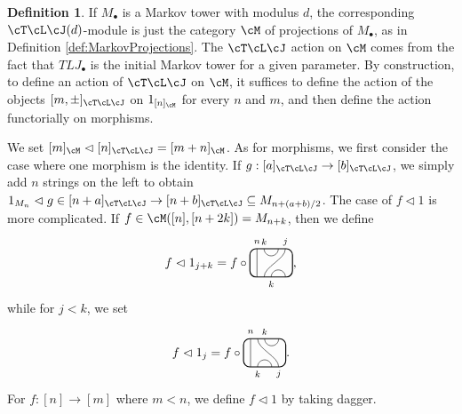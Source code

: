 \documentclass[11pt]{article}
\theoremstyle{plain}
\theoremstyle{definition}
\newtheorem{defn}[thm]{Definition}
\newcommand{\TLJ}{\cT\cL\cJ}
\newcommand{\TLPlusPIso}[3]{
 \TLTStart
 \TLTThrough{#1}
 \TLTSnakeR{#2}{#3}
 \TLTEnd
}
\newcommand{\TLMinusPIso}[3]{
 \TLTStart
 \TLTThrough{#1}
 \TLTSnakeL{#2}{#3}
 \TLTEnd
}
\newcommand{\TLTCalcLabelOffset}[3][0cm]{
 \settowidth{#2}{\scriptsize{$#3$}}
 \setlength{#2}{.5#2}
 \setlength{#2}{\maxof{#2}{#1}}
}
\newcommand{\TLTEnd}{
 \draw[thick, rounded corners = 5pt] (0,0) rectangle ($ (TLTlead) + (0,.8) $);
 \end{tikzpicture}
}
\newcommand{\TLTStart}{
 \begin{tikzpicture}[baseline=.3cm]
 \coordinate (TLTlead) at (.2,0); %
 \let\TLTlabelwidth\relax
 \newlength{\TLTlabelwidth}
}
\newcommand{\TLTThrough}[1]{
 \TLTCalcLabelOffset[.2cm]{\TLTlabelwidth}{#1}
 \coordinate (TLTlead) at ($ (TLTlead) + ({\TLTlabelwidth},0) $);
 \begin{scope}[shift=(TLTlead)]
  \draw (0,0) -- (0,.8);
  \node at (0,1) {\scriptsize{$#1$}};
 \end{scope}
  \coordinate (TLTlead) at ($ (TLTlead) + ({\TLTlabelwidth},0) $);
}
\newcommand{\TLTSnakeR}[2]{
 \let\TLTscwidth\relax
 \newlength{\TLTscwidth}
 \let\TLTsswidth\relax
 \newlength{\TLTsswidth}
 \TLTCalcLabelOffset[.2cm]{\TLTscwidth}{#1}
 \TLTCalcLabelOffset[.5cm]{\TLTsswidth}{#2}
 \setlength{\TLTlabelwidth}{\TLTscwidth+\TLTsswidth}
 \setlength{\TLTlabelwidth}{\maxof{\TLTlabelwidth}{.7cm}} %
 \coordinate (TLTlead) at ($ (TLTlead) + ({\TLTscwidth},0) $);
 \begin{scope}[shift=(TLTlead)]
  \draw (.1,.8) arc (-180:0:.2cm);
  \draw (.1,0) .. controls ++(90:.3cm) and ++(270:.3cm) .. ($ (.1,.8) + ({\TLTlabelwidth},0) $);
  \draw ($ (.1,0) + ({\TLTsswidth},0) $) arc (180:0:.2cm);
  \node at (.1,1) {\scriptsize{$#1$}};
  \node at ($ (.1,1) + ({\TLTlabelwidth},0) $) {\scriptsize{$#2$}};
  \node at ($ (.1,-.2) + ({\TLTsswidth},0) $) {\scriptsize{$#1$}};
 \end{scope}
 \coordinate (TLTlead) at ($ (TLTlead) + ({\TLTlabelwidth+\TLTsswidth},0) $);
}
\newcommand{\TLTSnakeL}[2]{
 \let\TLTscwidth\relax
 \newlength{\TLTscwidth}
 \let\TLTsswidth\relax
 \newlength{\TLTsswidth}
 \TLTCalcLabelOffset[.2cm]{\TLTscwidth}{#1}
 \TLTCalcLabelOffset[.1cm]{\TLTsswidth}{#2}
 \setlength{\TLTlabelwidth}{\TLTscwidth+\TLTsswidth}
 \setlength{\TLTlabelwidth}{\maxof{\TLTlabelwidth}{.5cm}} %
 \coordinate (TLTlead) at ($ (TLTlead) + ({\TLTsswidth},0) $);
 \begin{scope}[shift=(TLTlead)]
  \draw ($ (.1,.8) + ({\TLTsswidth+\TLTscwidth},0) $) arc (-180:0:.2cm);
  \draw ($ (.1,0) + ({\TLTlabelwidth},0) $) .. controls ++(90:.3cm) and ++(270:.3cm) .. (.1,.8);
  \draw (.1,0) arc (180:0:.2cm);
  \node at ($ (.1,1) + ({\TLTsswidth+\TLTscwidth},0) $) {\scriptsize{$#1$}};
  \node at (.1,1) {\scriptsize{$#2$}};
  \node at (.1,-.2) {\scriptsize{$#1$}};
 \end{scope}
 \setlength{\TLTscwidth}{\maxof{\TLTscwidth}{.5cm}} %
 \coordinate (TLTlead) at ($ (TLTlead) + ({\TLTlabelwidth+\TLTscwidth},0) $);
}
\begin{document}
\begin{defn}
\label{def:ModuleFromMarkovTower}
 If $M_\bullet$ is a Markov tower with modulus $d$, the corresponding $\cT\cL\cJ(d)$-module is just the category $\cM$ of projections of $M_\bullet$, as in Definition \ref{def:MarkovProjections}.  
The $\TLJ$ action on $\cM$ comes from the fact that $TLJ_\bullet$ is the initial Markov tower for a given parameter. %
By construction, to define an action of $\TLJ$ on $\cM$, it suffices to define the action of the objects $[m,\pm]_{\cT\cL\cJ}$ on $1_{[n]_\cM}$ for every $n$ and $m$, and then define the action functorially on morphisms. 
 
We set $[m]_\cM\vartriangleleft [n]_{\TLJ}=[m+n]_\cM$. 
As for morphisms, we first consider the case where one morphism is the identity. 
 If $g:[a]_{\TLJ}\to[b]_{\TLJ}$, we simply add $n$ strings on the left to obtain $1_{M_n}\vartriangleleft g\in[n+a]_{\TLJ}\to[n+b]_{\TLJ}\subseteq M_{n+(a+b)/2}$. %
 The case of $f\vartriangleleft 1$ is more complicated. If $f\in \cM([n],[n+2k])=M_{n+k}$, then we define 
\[f\vartriangleleft 1_{j+k}=f\circ
 \begin{tikzpicture}[baseline=.3cm]
  \draw (.2,0) -- (.2,.8);
  \node at (.2,1) {\scriptsize{$n$}};
  \draw (.6,0) arc (180:0:.2cm);
  \node at (.6,-.2) {\scriptsize{$k$}};
  \draw (.4,0) .. controls ++(90:.3cm) and ++(270:.3cm) .. (1,.8);
  \node at (1,1) {\scriptsize{$j$}};
  \draw (.4,.8) arc (-180:0:.2cm);
  \node at (.4,1) {\scriptsize{$k$}};
  \draw[thick, rounded corners = 5pt] (0,0) rectangle (1.2,.8);
 \end{tikzpicture}
 \text{,}\]
while for $j<k$, we set 
\[f\vartriangleleft 1_j=f\circ
 \begin{tikzpicture}[baseline=.3cm]
  \draw (.2,0) -- (.2,.8);
  \node at (.2,1) {\scriptsize{$n$}};
  \draw (.4,0) arc (180:0:.2cm);
  \node at (.4,-.2) {\scriptsize{$k$}};
  \draw (1,0) .. controls ++(90:.3cm) and ++(270:.3cm) .. (.4,.8);
  \node at (1,-.2) {\scriptsize{$j$}};
  \draw (.6,.8) arc (-180:0:.2cm);
  \node at (.6,1) {\scriptsize{$k$}};
  \draw[thick, rounded corners = 5pt] (0,0) rectangle (1.2,.8);
 \end{tikzpicture}
 \text{.}\]
For $f:[n]\to[m]$ where $m<n$, we define $f\vartriangleleft 1$ by taking dagger. 


\end{defn}
\end{document}

